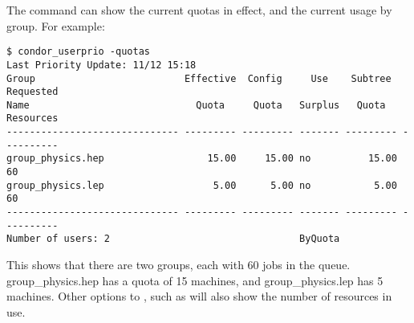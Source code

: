 The  command can show the current quotas in effect, 
and the current usage by group.
For example:
\begin{verbatim}
$ condor_userprio -quotas
Last Priority Update: 11/12 15:18
Group                          Effective  Config     Use    Subtree  Requested 
Name                             Quota     Quota   Surplus   Quota   Resources 
------------------------------ --------- --------- ------- --------- ----------
group_physics.hep                  15.00     15.00 no          15.00         60
group_physics.lep                   5.00      5.00 no           5.00         60
------------------------------ --------- --------- ------- --------- ----------
Number of users: 2                                 ByQuota                     
\end{verbatim}

This shows that there are two groups, each with 60 jobs in the queue.  
group\_physics.hep has a quota of 15 machines, 
and group\_physics.lep has 5 machines.  
Other options to ,
such as  will also show the number of resources in use.

